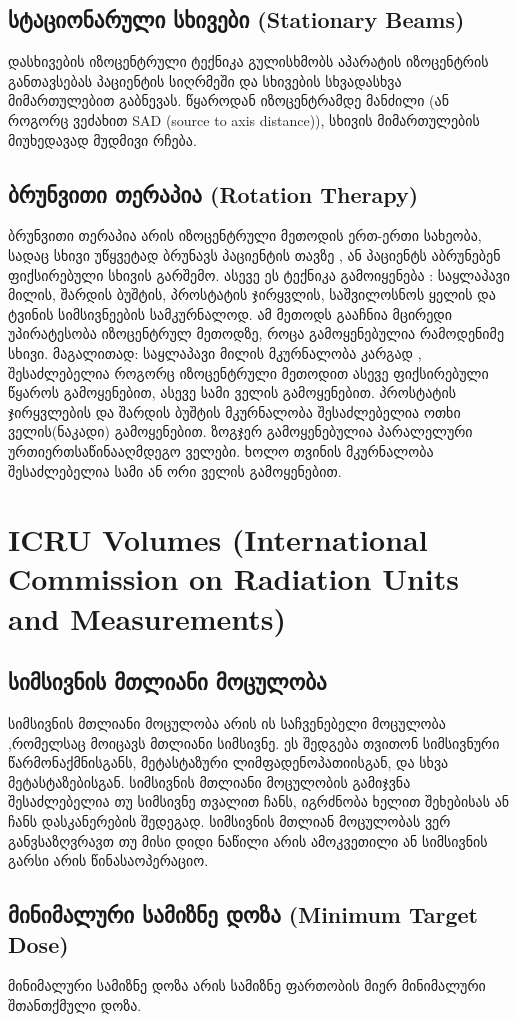 \documentclass[12pt,a4paper,]{report}
\begin{document}
\section{სტაციონარული სხივები (Stationary Beams)}
დასხივების იზოცენტრული ტექნიკა გულისხმობს აპარატის იზოცენტრის განთავსებას პაციენტის სიღრმეში და სხივების სხვადასხვა მიმართულებით გაბნევას. წყაროდან იზოცენტრამდე მანძილი (ან როგორც ვეძახით SAD (source to axis distance)), სხივის მიმართულების მიუხედავად მუდმივი რჩება.

\section{ბრუნვითი თერაპია (Rotation Therapy)}
ბრუნვითი თერაპია არის იზოცენტრული მეთოდის ერთ-ერთი სახეობა, სადაც სხივი უწყვეტად ბრუნავს პაციენტის თავზე , ან პაციენტს აბრუნებენ ფიქსირებული სხივის გარშემო. ასევე ეს ტექნიკა გამოიყენება : საყლაპავი მილის, შარდის ბუშტის, პროსტატის ჯირყვლის, საშვილოსნოს ყელის და ტვინის სიმსივნეების სამკურნალოდ.  ამ მეთოდს გააჩნია მცირედი უპირატესობა იზოცენტრულ მეთოდზე, როცა გამოყენებულია რამოდენიმე სხივი. მაგალითად: საყლაპავი მილის მკურნალობა კარგად , შესაძლებელია როგორც იზოცენტრული მეთოდით ასევე ფიქსირებული წყაროს გამოყენებით, ასევე სამი ველის გამოყენებით.  პროსტატის ჯირყვლების და შარდის ბუშტის მკურნალობა შესაძლებელია ოთხი ველის(ნაკადი) გამოყენებით.  ზოგჯერ გამოყენებულია პარალელური ურთიერთსაწინააღმდეგო ველები. ხოლო თვინის მკურნალობა შესაძლებელია სამი ან ორი ველის გამოყენებით.

\chapter{ICRU Volumes (International Commission on Radiation Units and Measurements)}
\section{სიმსივნის მთლიანი მოცულობა}
სიმსივნის მთლიანი მოცულობა არის ის საჩვენებელი მოცულობა ,რომელსაც მოიცავს მთლიანი სიმსივნე. ეს შედგება თვითონ სიმსივნური წარმონაქმნისგანს, მეტასტაზური ლიმფადენოპათიისგან,  და სხვა მეტასტაზებისგან. სიმსივნის მთლიანი მოცულობის გამიჯვნა შესაძლებელია თუ სიმსივნე თვალით ჩანს, იგრძნობა ხელით შეხებისას ან ჩანს დასკანერების შედეგად. სიმსივნის მთლიან მოცულობას ვერ განვსაზღვრავთ თუ მისი დიდი ნაწილი არის ამოკვეთილი ან სიმსივნის გარსი არის წინასაოპერაციო. 


\section{მინიმალური სამიზნე დოზა (Minimum Target Dose)}
მინიმალური სამიზნე დოზა არის სამიზნე ფართობის მიერ მინიმალური შთანთქმული დოზა.
\end{document}
